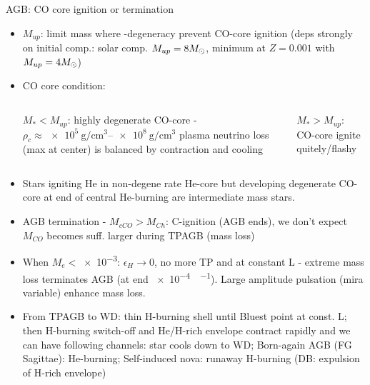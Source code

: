 \begin{frame}{AGB: CO core ignition or termination}
    \begin{itemize}
        \item $M_{up}$: limit  mass where \Pelectron-degeneracy prevent CO-core ignition (deps strongly on initial comp.: solar comp. $M_{up}=8M_{\odot}{}$,  minimum at $Z=0.001$ with $M_{up}=4M_{\odot}{}$)
        \item CO core condition:
                \begin{columns}[T]
                    \begin{column}{0.5\textwidth}
                        $M_*<M_{up}$: highly degenerate CO-core - $\rho_c\approx\SIrange{e5}{e8}{\gram\per\cubic\cm}$ plasma neutrino loss (max at center) is balanced by contraction and cooling
                    \end{column}
                    \begin{column}{0.5\textwidth}
                        $M_*>M_{up}$: CO-core ignite quitely/flashy
                    \end{column}
                \end{columns} 
            \item Stars igniting He in non-degene rate He-core but developing degenerate CO-core at end of central He-burning are intermediate mass stars.
            \item AGB termination - $M_{cCO}>M_{Ch}$: C-ignition (AGB ends), we don't expect $M_{CO}$ becomes suff. larger during TPAGB (mass loss)
            \item When $M_e<$\SI{e-3}{\solarmass}: $\epsilon_H\to0$, no more TP and  at constant L - extreme mass loss terminates AGB (at end \SI{e-4}{\solarmass\per\year}). Large amplitude pulsation (mira variable) enhance mass loss.
            \item From TPAGB to WD: thin H-burning shell until Bluest point at const. L; then H-burning switch-off and He/H-rich envelope contract rapidly and we can have following channels: star cools down to WD; Born-again AGB (FG Sagittae): He-burning; Self-induced nova: runaway H-burning (DB: expulsion of H-rich envelope)
        \end{itemize}
\end{frame}

